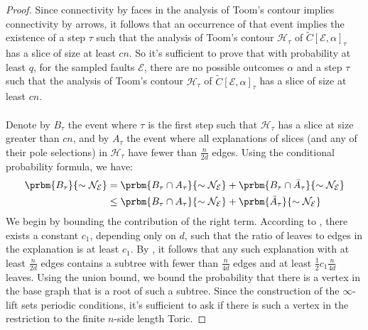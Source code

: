 \begin{proof}
    Since connectivity by faces in the analysis of Toom's contour implies connectivity by arrows, it follows that an occurrence of that event implies the existence of a step $\tau$ such that the analysis of Toom's contour $\mathcal{H}_{\tau}$ of $\tilde{C}[\mathcal{E},\alpha]_{\tau}$ has a slice of size at least $cn$. So it's sufficient to prove that with probability at least $q$, for the sampled faults $\mathcal{E}$, there are no possible outcomes $\alpha$ and a step $\tau$ such that the analysis of Toom's contour $\mathcal{H}_{\tau}$ of $\tilde{C}[\mathcal{E},\alpha]_{\tau}$ has a slice of size at least $cn$.
    \paragraph{} 
    
Denote by $B_{\tau}$ the event where $\tau$ is the first step such that $\mathcal{H}_{\tau}$ has a slice at size greater than $cn$, and by $A_{\tau}$ the event where all explanations of slices (and any of their pole selections) in $\mathcal{H}_{\tau}$ have fewer than $\frac{n}{2d}$ edges. Using the conditional probability formula, we have:
    \begin{equation*}
      \begin{split}
        \prbm{  B_{\tau}    }{ \sim \mathcal{N}_{\mathcal{E}} } & =  \prbm{  B_{\tau}  \cap A_{\tau}  }{ \sim \mathcal{N}_{\mathcal{E}} } + \prbm{  B_{\tau} \cap \bar{A}_{\tau}    }{ \sim \mathcal{N}_{\mathcal{E}} }  \\
  & \le \prbm{  B_{\tau}  \cap A_{\tau}  }{ \sim \mathcal{N}_{\mathcal{E}} } + \prbm{ \bar{A}_{\tau}    }{ \sim \mathcal{N}_{\mathcal{E}} }  \\
      \end{split}
    \end{equation*}
    We begin by bounding the contribution of the right term. According to , there exists a constant $c_{1}$, depending only on $d$, such that the ratio of leaves to edges in the explanation is at least $c_{1}$. By , it follows  that any such explanation with at least $\frac{n}{2d}$ edges contains a subtree with fewer than $\frac{n}{4d}$ edges and at least $\frac{1}{2}c_1 \frac{n}{4d}$ leaves. Using the union bound, we bound the probability that there is a vertex in the base graph that is a root of such a subtree. Since the construction of the $\infty$-lift sets periodic conditions, it's sufficient to ask if there is such a vertex in the restriction to the finite $n$-side length Toric.

\end{proof}
